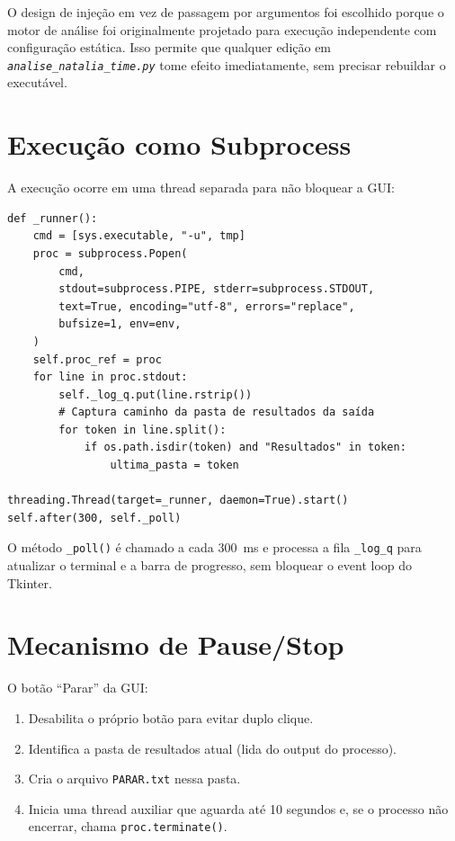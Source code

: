 \documentclass[12pt,a4paper]{report}
\newcommand{\code}[1]{\texttt{#1}}
\newcommand{\arquivo}[1]{\texttt{\itshape #1}}
\begin{document}
O design de injeção em vez de passagem por argumentos foi escolhido porque
o motor de análise foi originalmente projetado para execução independente
com configuração estática. Isso permite que qualquer edição em
\arquivo{analise\_natalia\_time.py} tome efeito imediatamente, sem precisar
rebuildar o executável.

\section{Execução como Subprocess}

A execução ocorre em uma thread separada para não bloquear a GUI:

\begin{lstlisting}[caption={Execução como subprocess em thread daemon}]
def _runner():
    cmd = [sys.executable, "-u", tmp]
    proc = subprocess.Popen(
        cmd,
        stdout=subprocess.PIPE, stderr=subprocess.STDOUT,
        text=True, encoding="utf-8", errors="replace",
        bufsize=1, env=env,
    )
    self.proc_ref = proc
    for line in proc.stdout:
        self._log_q.put(line.rstrip())
        # Captura caminho da pasta de resultados da saída
        for token in line.split():
            if os.path.isdir(token) and "Resultados" in token:
                ultima_pasta = token

threading.Thread(target=_runner, daemon=True).start()
self.after(300, self._poll)
\end{lstlisting}

O método \code{\_poll()} é chamado a cada 300~ms e processa a fila
\code{\_log\_q} para atualizar o terminal e a barra de progresso,
sem bloquear o event loop do Tkinter.

\section{Mecanismo de Pause/Stop}

O botão ``Parar'' da GUI:
\begin{enumerate}
  \item Desabilita o próprio botão para evitar duplo clique.
  \item Identifica a pasta de resultados atual (lida do output do processo).
  \item Cria o arquivo \code{PARAR.txt} nessa pasta.
  \item Inicia uma thread auxiliar que aguarda até 10 segundos e, se
    o processo não encerrar, chama \code{proc.terminate()}.
\end{enumerate}
\end{document}
